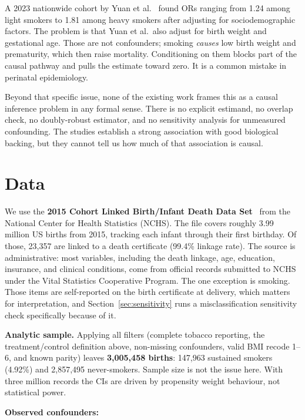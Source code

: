 \documentclass[11pt]{article}
\begin{document}
A 2023 nationwide cohort by Yuan et al.~\cite{yuan2023} found ORs ranging from
1.24 among light smokers to 1.81 among heavy smokers after adjusting for
sociodemographic factors. The problem is that Yuan et al.\ also adjust for birth
weight and gestational age. Those are not confounders; smoking \emph{causes}
low birth weight and prematurity, which then raise mortality. Conditioning on
them blocks part of the causal pathway and pulls the estimate toward zero.
It is a common mistake in perinatal epidemiology.

Beyond that specific issue, none of the existing work frames this as a causal
inference problem in any formal sense. There is no explicit estimand, no overlap
check, no doubly-robust estimator, and no sensitivity analysis for unmeasured
confounding. The studies establish a strong association with good biological
backing, but they cannot tell us how much of that association is causal.


\section{Data}

We use the \textbf{2015 Cohort Linked Birth/Infant Death Data
Set}~\cite{nchs2015} from the National Center for Health Statistics (NCHS).
The file covers roughly 3.99 million US births from 2015, tracking each infant
through their first birthday. Of those, 23,357 are linked to a death
certificate (99.4\% linkage rate). The source is administrative: most variables,
including the death linkage, age, education, insurance, and clinical conditions,
come from official records submitted to NCHS under the Vital Statistics
Cooperative Program. The one exception is smoking. Those items are self-reported
on the birth certificate at delivery, which matters for interpretation, and
Section~\ref{sec:sensitivity} runs a misclassification sensitivity check
specifically because of it.

\textbf{Analytic sample.} Applying all filters (complete tobacco reporting,
the treatment/control definition above, non-missing confounders, valid BMI
recode 1--6, and known parity) leaves \textbf{3,005,458 births}:
147,963 sustained smokers (4.92\%) and 2,857,495 never-smokers.
Sample size is not the issue here. With three million records the CIs
are driven by propensity weight behaviour, not statistical power.

\textbf{Observed confounders:}
\end{document}
